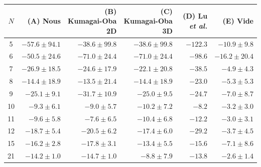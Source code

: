 \begin{tabular}{c r r r r r}
    \hline\hline
    $N$ & (A) Nous & (B) Kumagai-Oba 2D & (C) Kumagai-Oba 3D & (D) Lu \textit{et al.} & (E) Vide \\
    \hline
    5  & $-57.6 \pm 94.1$ & $-38.6 \pm 99.8$ & $-38.6 \pm 99.8$ & $-122.3$ & $-10.9 \pm 9.8$ \\
    6  & $-50.5 \pm 24.6$ & $-71.0 \pm 24.4$ & $-71.0 \pm 24.4$ & $-98.6$  & $-16.2 \pm 20.4$ \\
    7  & $-26.9 \pm 18.5$ & $-24.6 \pm 17.9$ & $-22.1 \pm 20.8$ & $-38.5$  & $-4.9 \pm 4.3$ \\
    8  & $-14.4 \pm 18.9$ & $-13.5 \pm 21.4$ & $-14.4 \pm 18.9$ & $-23.0$  & $-5.3 \pm 5.3$ \\
    9  & $-25.1 \pm 9.1$  & $-31.7 \pm 10.9$ & $-25.0 \pm 9.5$  & $-24.7$  & $-7.0 \pm 8.7$ \\
    10 & $-9.3 \pm 6.1$   & $-9.0 \pm 5.7$   & $-10.2 \pm 7.2$  & $-8.2$   & $-3.2 \pm 3.0$ \\
    11 & $-9.6 \pm 5.8$   & $-7.6 \pm 6.5$   & $-10.4 \pm 6.8$  & $-12.2$  & $-3.0 \pm 3.1$ \\
    12 & $-18.7 \pm 5.4$  & $-20.5 \pm 6.2$  & $-17.4 \pm 6.0$  & $-29.2$  & $-3.7 \pm 4.5$ \\
    \hline
    15 & $-16.2 \pm 2.8$  & $-17.8 \pm 3.1$  & $-13.4 \pm 5.5$  & $-15.6$  & $-7.1 \pm 8.6$ \\
    21 & $-14.2 \pm 1.0$  & $-14.7 \pm 1.0$  & $-8.8 \pm 7.9$   & $-13.8$  & $-2.6 \pm 1.4$ \\
    \hline\hline
\end{tabular}

